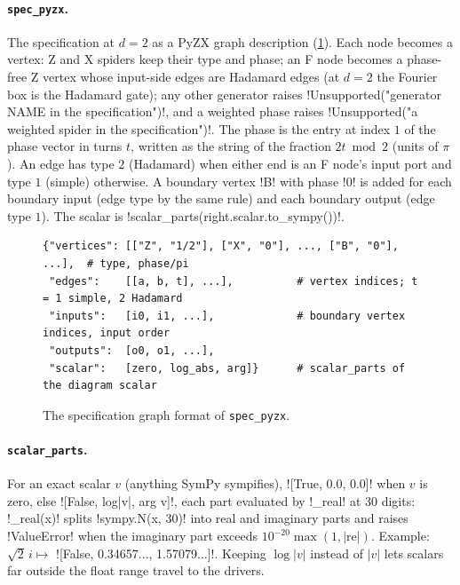 \paragraph{\texttt{spec\_pyzx}.} The specification at $d=2$ as a PyZX graph description (\cref{fig:bench-tools-pyzx-json}). Each node becomes a vertex: Z and X spiders keep their type and phase; an F node becomes a phase-free Z vertex whose input-side edges are Hadamard edges (at $d=2$ the Fourier box is the Hadamard gate); any other generator raises \py!Unsupported("generator NAME in the specification")!, and a weighted phase raises \py!Unsupported("a weighted spider in the specification")!. The phase is the entry at index $1$ of the phase vector in turns $t$, written as the string of the fraction $2t\bmod2$ (units of $\pi$). An edge has type $2$ (Hadamard) when either end is an F node's input port and type $1$ (simple) otherwise. A boundary vertex \code!B! with phase \code!0! is added for each boundary input (edge type by the same rule) and each boundary output (edge type $1$). The scalar is \py!scalar_parts(right.scalar.to_sympy())!.

\begin{figure}[H]
\begin{lstlisting}[style=python]
{"vertices": [["Z", "1/2"], ["X", "0"], ..., ["B", "0"], ...],  # type, phase/pi
 "edges":    [[a, b, t], ...],          # vertex indices; t = 1 simple, 2 Hadamard
 "inputs":   [i0, i1, ...],             # boundary vertex indices, input order
 "outputs":  [o0, o1, ...],
 "scalar":   [zero, log_abs, arg]}      # scalar_parts of the diagram scalar
\end{lstlisting}
\caption{The specification graph format of \texttt{spec\_pyzx}.}\label{fig:bench-tools-pyzx-json}
\end{figure}

\paragraph{\texttt{scalar\_parts}.} For an exact scalar $v$ (anything SymPy sympifies), \py![True, 0.0, 0.0]! when $v$ is zero, else \py![False, log|v|, arg v]!, each part evaluated by \py!_real! at 30 digits: \py!_real(x)! splits \py!sympy.N(x, 30)! into real and imaginary parts and raises \py!ValueError! when the imaginary part exceeds $10^{-20}\max(1,|\mathrm{re}|)$. Example: $\sqrt2\,i\mapsto$ \py![False, 0.34657..., 1.57079...]!. Keeping $\log|v|$ instead of $|v|$ lets scalars far outside the float range travel to the drivers.

